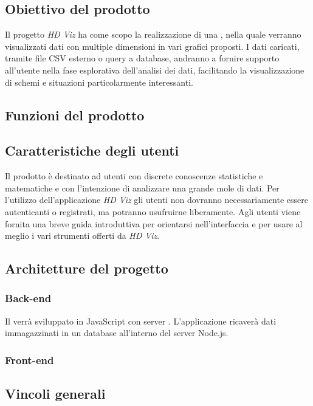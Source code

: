 \documentclass[../analisi-dei-requisiti.tex]{subfiles}
\begin{document}
\subsection{Obiettivo del prodotto}
\label{subs:obiettivo_del_prodotto}
Il progetto \emph{HD Viz} ha come scopo la realizzazione di una , nella quale verranno visualizzati dati con multiple dimensioni in vari grafici proposti.
I dati caricati, tramite file CSV esterno o query a database, andranno a fornire supporto all'utente nella fase esplorativa dell'analisi dei dati, facilitando la visualizzazione di schemi e situazioni particolarmente interessanti.


\subsection{Funzioni del prodotto}
\label{subs:funzioni_del_prodotto}


\subsection{Caratteristiche degli utenti}
\label{subs:caratteristiche_degli_utenti}
Il prodotto è destinato ad utenti con discrete conoscenze statistiche e matematiche e con l'intenzione di analizzare una grande mole di dati.
Per l'utilizzo dell'applicazione \emph{HD Viz} gli utenti non dovranno necessariamente essere autenticanti o registrati, ma potranno usufruirne liberamente.
Agli utenti viene fornita una breve guida introduttiva per orientarsi nell'interfaccia e per usare al meglio i vari strumenti offerti da \emph{HD Viz}.

\subsection{Architetture del progetto}
\label{subs:architetture_e_tecnologie_del_progetto}
\subsubsection{Back-end}
Il  verrà sviluppato in JavaScript con server . L'applicazione ricaverà dati immagazzinati in un database  all'interno del server Node.js.


\subsubsection{Front-end}


\subsection{Vincoli generali}
\label{subs:vincoli_generali}
\end{document}
